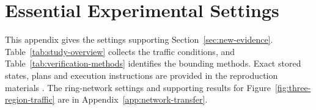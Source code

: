 \documentclass[final]{cas-sc}
\theoremstyle{definition}
\theoremstyle{plain}
\theoremstyle{definition}
\theoremstyle{plain}
\newcommand{\appref}[1]{Appendix~\ref{#1}}
\begin{document}
\section{Essential Experimental Settings}
\label{app:experimental-settings}
\label{app:reusable-benchmark}
\label{sec:supp-queue-settings}
\label{app:benchmark-details}

This appendix gives the settings supporting
Section~\ref{sec:new-evidence}. Table~\ref{tab:study-overview} collects
the traffic conditions, and Table~\ref{tab:verification-methods}
identifies the bounding methods. Exact stored states, plans and
execution instructions are provided in the reproduction materials
\cite{perimeterReproductionGuide}. The ring-network settings and
supporting results for Figure~\ref{fig:three-region-traffic} are in
\appref{app:network-transfer}.
\end{document}
